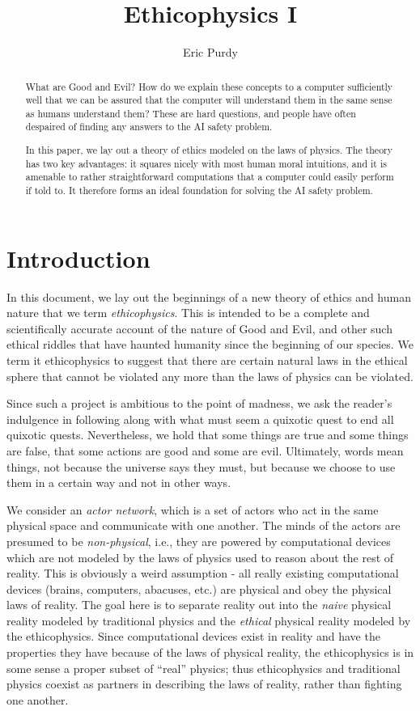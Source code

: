 \documentclass{article}
\title{Ethicophysics I}
\author{Eric Purdy}
\begin{document}
\maketitle

\begin{abstract}
What are Good and Evil? How do we explain these concepts to a computer
sufficiently well that we can be assured that the computer will
understand them in the same sense as humans understand them? These are
hard questions, and people have often despaired of finding any answers
to the AI safety problem.

In this paper, we lay out a theory of ethics modeled on the laws of
physics. The theory has two key advantages: it squares nicely with
most human moral intuitions, and it is amenable to rather
straightforward computations that a computer could easily perform if
told to. It therefore forms an ideal foundation for solving the AI
safety problem.
\end{abstract}

\section{Introduction}

In this document, we lay out the beginnings of a new theory of ethics
and human nature that we term {\em ethicophysics}. This is intended to
be a complete and scientifically accurate account of the nature of
Good and Evil, and other such ethical riddles that have haunted
humanity since the beginning of our species. We term it ethicophysics
to suggest that there are certain natural laws in the ethical sphere
that cannot be violated any more than the laws of physics can be
violated.

Since such a project is ambitious to the point of madness, we ask the
reader's indulgence in following along with what must seem a quixotic
quest to end all quixotic quests. Nevertheless, we hold that some
things are true and some things are false, that some actions are good
and some are evil. Ultimately, words mean things, not because the
universe says they must, but because we choose to use them in a
certain way and not in other ways.

We consider an {\em actor network}, which is a set of actors who act
in the same physical space and communicate with one another. The minds
of the actors are presumed to be {\em non-physical}, i.e., they are
powered by computational devices which are not modeled by the laws of
physics used to reason about the rest of reality. This is obviously a
weird assumption - all really existing computational devices (brains,
computers, abacuses, etc.) are physical and obey the physical laws of
reality. The goal here is to separate reality out into the {\em naive}
physical reality modeled by traditional physics and the {\em ethical}
physical reality modeled by the ethicophysics. Since computational
devices exist in reality and have the properties they have because of
the laws of physical reality, the ethicophysics is in some sense a
proper subset of ``real'' physics; thus ethicophysics and traditional
physics coexist as partners in describing the laws of reality, rather
than fighting one another.
\end{document}
